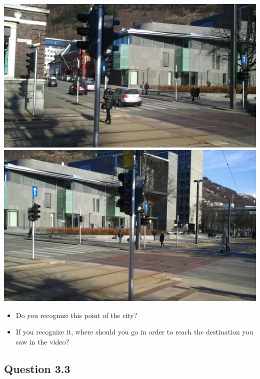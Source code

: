 \documentclass[12pt,a4paper,openright, notitlepage]{report}
\begin{document}
\includegraphics[width=\textwidth]{imgs/image-question32-1}
\includegraphics[width=\textwidth]{imgs/image-question32-2}

\begin{itemize}
	\item Do you recognize this point of the city?
	\item If you recognize it, where should you go in order to reach the destination you saw in the video?
\end{itemize}

\newpage

\subsection{Question 3.3}
\end{document}
